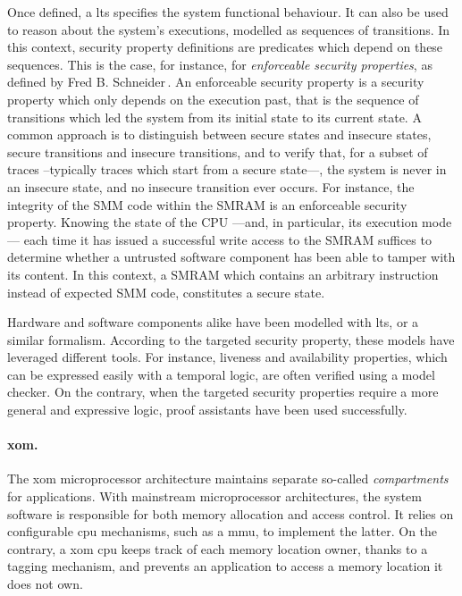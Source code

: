 Once defined, a \ac{lts} specifies the system functional behaviour.
%
It can also be used to reason about the system's executions, modelled as
sequences of transitions.
%
In this context, security property definitions are predicates which depend on
these sequences.
%
This is the case, for instance, for \emph{enforceable security properties}, as
defined by Fred B. Schneider\,\cite{schneider2000enforceable}.
%
An enforceable security property is a security property which only depends on
the execution past, that is the sequence of transitions which led the system
from its initial state to its current state.
%
A common approach is to distinguish between secure states and insecure states,
secure transitions and insecure transitions, and to verify that, for a subset of
traces --typically traces which start from a secure state---, the system is
never in an insecure state, and no insecure transition ever occurs.
%
For instance, the integrity of the SMM code within the SMRAM is an enforceable
security property.
%
Knowing the state of the CPU ---and, in particular, its execution mode--- each
time it has issued a successful write access to the SMRAM suffices to determine
whether a untrusted software component has been able to tamper with its content.
%
In this context, a SMRAM which contains an arbitrary instruction instead of
expected SMM code, constitutes a secure state.

Hardware and software components alike have been modelled with \ac{lts}, or a
similar formalism.
%
According to the targeted security property, these models have leveraged
different tools.
%
For instance, liveness and availability properties, which can be expressed
easily with a temporal logic, are often verified using a model checker.
%
On the contrary, when the targeted security properties require a more general
and expressive logic, proof assistants have been used successfully.

\paragraph{\ac{xom}.}
%
The \ac{xom} microprocessor architecture maintains separate so-called
\emph{compartments} for applications.
%
With mainstream microprocessor architectures, the system software is responsible
for both memory allocation and access control.
%
It relies on configurable \ac{cpu} mechanisms, such as a \ac{mmu}, to implement
the latter.
%
On the contrary, a \ac{xom} \ac{cpu} keeps track of each memory location owner,
thanks to a tagging mechanism, and prevents an application to access a memory
location it does not own.

